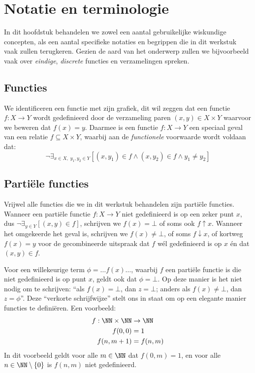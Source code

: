 
\chapter{Notatie en terminologie}
\label{chp:notatie}

In dit hoofdstuk behandelen we zowel een aantal gebruikelijke wiskundige concepten, als een aantal specifieke notaties en begrippen die in dit werkstuk vaak zullen terugkeren. Gezien de aard van het onderwerp zullen we bijvoorbeeld vaak over \emph{eindige}, \emph{discrete} functies en verzamelingen spreken.

\section{Functies}
\label{sec:afbeeldingen}

We identificeren een functie met zijn grafiek, dit wil zeggen dat een functie $f : X \to Y$ wordt gedefinieerd door de verzameling paren $(x, y) \in X \times Y$ waarvoor we beweren dat $f(x) = y$. Daarmee is een functie $f : X \to Y$ een speciaal geval van een relatie $f \subseteq X \times Y$, waarbij aan de \emph{functionele} voorwaarde wordt voldaan dat:
%
\begin{equation*}
  \neg \exists_{x \in X,\; y_1,y_2 \in Y} \left[ (x, y_1) \in f \land (x, y_2) \in f \land y_1 \neq y_2 \right]
\end{equation*}

\section{Partiële functies}
\label{sec:partielefuncties}

Vrijwel alle functies die we in dit werkstuk behandelen zijn partiële functies. Wanneer een partiële functie $f : X \to Y$ niet gedefinieerd is op een zeker punt $x$, dus $\neg \exists_{y \in Y} [ (x, y) \in f ]$, schrijven we $f(x) = \bot$ of soms ook $f \uparrow x$. Wanneer het omgekeerde het geval is, schrijven we $f(x) \neq \bot$, of soms $f \downarrow x$, of kortweg $f(x) = y$ voor de gecombineerde uitspraak dat $f$ wél gedefinieerd is op $x$ én dat $(x, y) \in f$.

Voor een willekeurige term $\phi = \dots f(x)\dots$, waarbij $f$ een partiële functie is die niet gedefinieerd is op punt $x$, geldt ook dat $\phi = \bot$. Op deze manier is het niet nodig om te schrijven: “als $f(x) = \bot$, dan $z = \bot$; anders als $f(x) \neq \bot$, dan $z = \phi$”. Deze “verkorte schrijfwijze” stelt ons in staat om op een elegante manier functies te definiëren. Een voorbeeld:
\begin{align*}
  f : \NN \times \NN &\to \NN \\
  f(0, 0) &= 1 \\
  f(n, m + 1) &= f(n, m)
\end{align*}
In dit voorbeeld geldt voor alle $m \in \NN$ dat $f(0, m) = 1$, en voor alle $n \in \NN \setminus \{0\}$ is $f(n, m)$ niet gedefinieerd.

